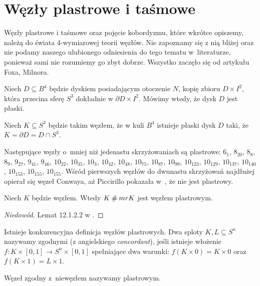 \section{Węzły plastrowe i taśmowe} %
\label{sec:slice}
Węzły plastrowe i taśmowe oraz pojęcie kobordyzmu, które wkrótce opiszemy, należą do świata 4-wymiarowej teorii węzłów.
Nie zapoznamy się z nią bliżej oraz nie podamy naszego ulubionego odniesienia do tego tematu w~literaturze, ponieważ sami nie rozumiemy go zbyt dobrze.
Wszystko zaczęło się od artykułu \cite{fox66} Foxa, Milnora.

\begin{definition}[płaski]
    Niech $D \subseteq B^4$ będzie dyskiem posiadającym otoczenie $N$, kopię zbioru $D \times I
    ^2$, która przecina sferę $S^3$ dokładnie w $\partial D \times I^2$.
    Mówimy wtedy, że dysk $D$ jest płaski.
\end{definition}

\begin{definition}
    Niech $K \subseteq S^3$ będzie takim węzłem, że w kuli $B^4$ istnieje płaski dysk $D$ taki, że $K = \partial D = D \cap S^3$.
\end{definition}

Następujące węzły o~mniej niż jedenastu skrzyżowaniach są plastrowe: $6_1$, $8_{20}$, $8_{8}$, $8_{9}$, $9_{27}$, $9_{41}$, $9_{46}$, $10_{22}$, $10_{35}$, $10_{3}$, $10_{42}$, $10_{48}$, $10_{75}$, $10_{87}$, $10_{99}$, $10_{123}$, $10_{129}$, $10_{137}$, $10_{140}$, $10_{153}$, $10_{155}$, $10_{155}$.
Wśród pierwszych węzłów do dwunastu skrzyżowań najdłużej opierał się węzeł Conwaya, aż Piccirillo pokazała w~\cite{piccirillo20}, że nie jest plastrowy.

\begin{proposition}
    Niech $K$ będzie węzłem.
    Wtedy $K \mathbin{\#} mr K$ jest węzłem plastrowym.
\end{proposition}

\begin{proof}[Niedowód]
    Lemat 12.1.2.2 w \cite{kawauchi96}.
\end{proof}

Istnieje konkurencyjna definicja węzłów plastrowych.
Dwa sploty $K, L \subseteq S^n$ nazywamy zgodnymi (z angielskiego \emph{concordant}), jeśli istnieje włożenie $f \colon K \times [0,1] \to S^n \times [0,1]$ spełniające dwa warunki: $f(K \times 0) = K \times 0$ oraz $f(K \times 1) = L \times 1$.

\begin{definition} \label{def:slice_knot}
    Węzeł zgodny z~niewęzłem nazywamy plastrowym.
\end{definition}


